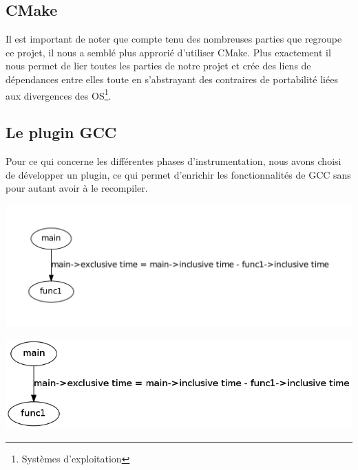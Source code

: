 


\subsection{CMake}

Il est important de noter que compte tenu des nombreuses parties que regroupe ce projet, il nous a semblé plus approrié d'utiliser CMake. Plus exactement il nous permet de lier toutes les parties de notre projet et crée des liens de dépendances entre elles toute en s'abstrayant des contraires de portabilité liées aux divergences des OS\footnote{Systèmes d'exploitation}.

\subsection{Le plugin GCC}

Pour ce qui concerne les différentes phases d'instrumentation, nous avons choisi de développer un plugin, ce qui permet d'enrichir les fonctionnalités de GCC sans pour autant avoir à le recompiler.

\begin{center}
  \includegraphics[scale=0.50]{images/tree2.pdf}
\end{center}

\begin{center}
  \includegraphics[scale=0.50]{images/tree.png}
\end{center}

